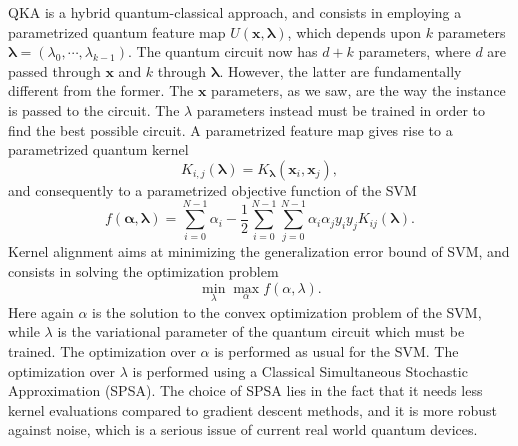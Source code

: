 \documentclass[12pt]{article}
\begin{document}
QKA is a hybrid quantum-classical approach, and consists in employing a parametrized quantum feature map $U(\mathbf{x}, \mathbf{\lambda})$, which depends upon $k$ parameters $\mathbf{\lambda}=(\lambda_0,\cdots, \lambda_{k-1})$. The quantum circuit now has $d+k$ parameters, where $d$ are passed through $\mathbf{x}$ and $k$ through $\mathbf{\lambda}$. However, the latter are fundamentally different from the former. The $\mathbf{x}$ parameters, as we saw, are the way the instance is passed to the circuit. The $\lambda$ parameters instead must be trained in order to find the best possible circuit. A parametrized feature map gives rise to a parametrized quantum kernel $$K_{i,j}(\mathbf{\lambda})=K_{\mathbf{\lambda}}(\mathbf{x}_i, \mathbf{x}_j),$$ and consequently to a parametrized objective function of the SVM
\begin{equation}
            f(\mathbf{\alpha}, \mathbf{\lambda})=\sum_{i=0}^{N-1} \alpha_i-\frac{1}{2}\sum_{i=0}^{N-1}\sum_{j=0}^{N-1}\alpha_i\alpha_jy_iy_jK_{ij}(\mathbf{\lambda}).
            \label{qka}
\end{equation}
Kernel alignment aims at minimizing the generalization error bound of SVM, and consists in solving the optimization problem
\begin{equation}
    \min_{\lambda}\max_{\alpha}f(\alpha, \lambda).
\end{equation} 
Here again $\alpha$ is the solution to the convex optimization problem of the SVM, while $\lambda$ is the variational parameter of the quantum circuit which must be trained. The optimization over $\alpha$ is performed as usual for the SVM. The optimization over $\lambda$ is performed using a Classical Simultaneous Stochastic Approximation (SPSA). \cite{spall1992} The choice of SPSA lies in the fact that it needs less kernel evaluations compared to gradient descent methods, and it is more robust against noise, which is a serious issue of current real world quantum devices.    
\end{document}
